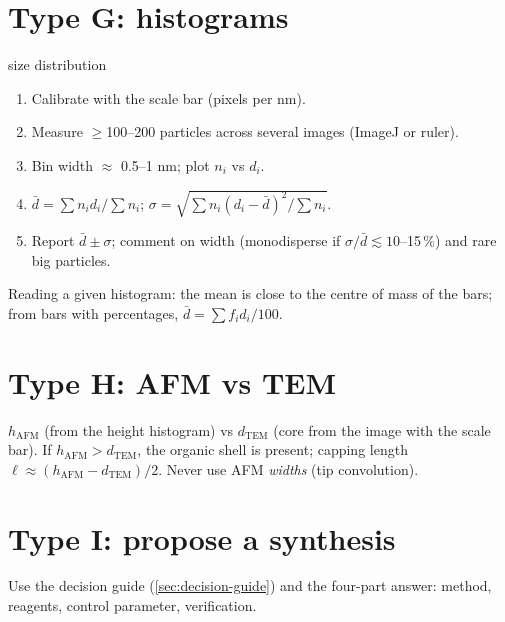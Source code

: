 \section{Type G: histograms}
\begin{recipe}{size distribution}
\begin{enumerate}
  \item Calibrate with the scale bar (pixels per nm).
  \item Measure $\geq$100--200 particles across several images (ImageJ or ruler).
  \item Bin width $\approx$ 0.5--1 nm; plot $n_i$ vs $d_i$.
  \item $\bar d = \sum n_i d_i/\sum n_i$; $\sigma = \sqrt{\sum n_i(d_i-\bar d)^2/\sum n_i}$.
  \item Report $\bar d \pm \sigma$; comment on width (monodisperse if $\sigma/\bar d\lesssim 10$--15\,\%\extra) and rare big
        particles.
\end{enumerate}
\end{recipe}
Reading a given histogram: the mean is close to the centre of mass of the bars; from bars with percentages,
$\bar d = \sum f_i d_i/100$.

\section{Type H: AFM vs TEM}
$h_\mathrm{AFM}$ (from the height histogram) vs $d_\mathrm{TEM}$ (core from the image with the scale bar). If
$h_\mathrm{AFM} > d_\mathrm{TEM}$, the organic shell is present; capping length $\ell \approx (h_\mathrm{AFM}-d_\mathrm{TEM})/2$.
Never use AFM \emph{widths} (tip convolution).

\section{Type I: propose a synthesis}
Use the decision guide (\cref{sec:decision-guide}) and the four-part answer: method, reagents, control parameter,
verification.

